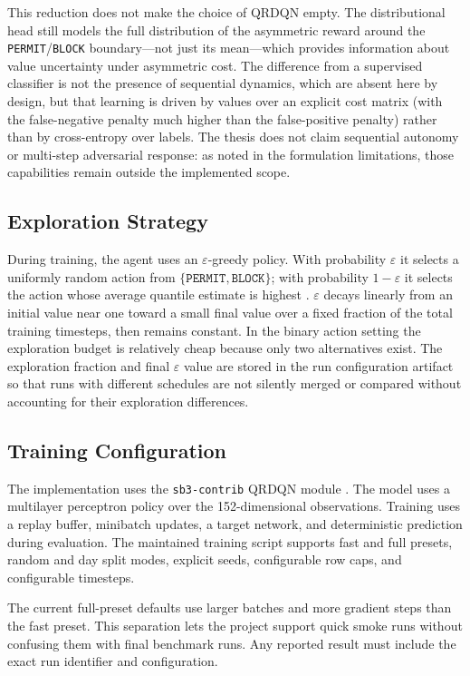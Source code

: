 This reduction does not make the choice of QRDQN empty. The distributional head still models the full distribution of the asymmetric reward around the \texttt{PERMIT}/\texttt{BLOCK} boundary---not just its mean---which provides information about value uncertainty under asymmetric cost. The difference from a supervised classifier is not the presence of sequential dynamics, which are absent here by design, but that learning is driven by values over an explicit cost matrix (with the false-negative penalty much higher than the false-positive penalty) rather than by cross-entropy over labels. The thesis does not claim sequential autonomy or multi-step adversarial response: as noted in the formulation limitations, those capabilities remain outside the implemented scope.

\subsection{Exploration Strategy}
During training, the agent uses an $\varepsilon$-greedy policy. With probability $\varepsilon$ it selects a uniformly random action from $\{\texttt{PERMIT}, \texttt{BLOCK}\}$; with probability $1-\varepsilon$ it selects the action whose average quantile estimate is highest \parencite{Mnih2015DQN}. $\varepsilon$ decays linearly from an initial value near one toward a small final value over a fixed fraction of the total training timesteps, then remains constant. In the binary action setting the exploration budget is relatively cheap because only two alternatives exist. The exploration fraction and final $\varepsilon$ value are stored in the run configuration artifact so that runs with different schedules are not silently merged or compared without accounting for their exploration differences.

\subsection{Training Configuration}
The implementation uses the \texttt{sb3-contrib} QRDQN module \parencite{SB3ContribQRDQNDocs}. The model uses a multilayer perceptron policy over the 152-dimensional observations. Training uses a replay buffer, minibatch updates, a target network, and deterministic prediction during evaluation. The maintained training script supports fast and full presets, random and day split modes, explicit seeds, configurable row caps, and configurable timesteps.

The current full-preset defaults use larger batches and more gradient steps than the fast preset. This separation lets the project support quick smoke runs without confusing them with final benchmark runs. Any reported result must include the exact run identifier and configuration.

